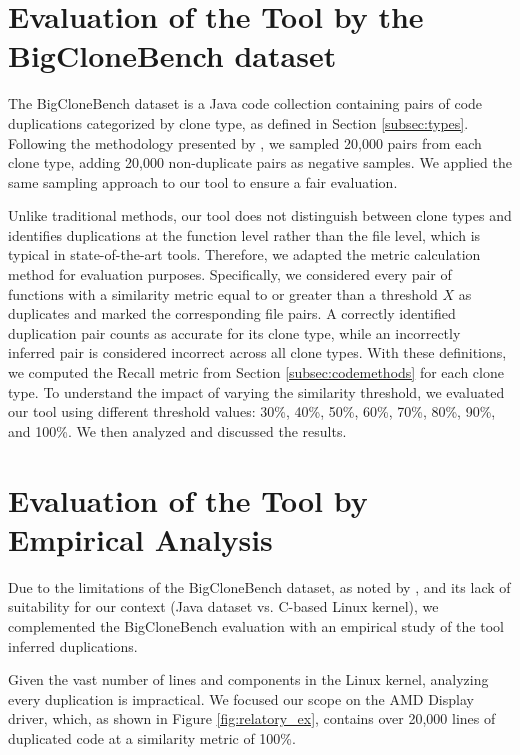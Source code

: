 \section{Evaluation of the Tool by the BigCloneBench dataset}

\label{sec:metbig}

The BigCloneBench dataset \citep{bigclonebench} is a Java code collection containing pairs of code duplications categorized by clone type, as defined in Section \ref{subsec:types}.
%
Following the methodology presented by \citep{tailor}, we sampled 20,000 pairs from each clone type, adding 20,000 non-duplicate pairs as negative samples. We applied the same sampling approach to our tool to ensure a fair evaluation.

Unlike traditional methods, our tool does not distinguish between clone types and identifies duplications at the function level rather than the file level, which is typical in state-of-the-art tools. Therefore, we adapted the metric calculation method for evaluation purposes. Specifically, we considered every pair of functions with a similarity metric equal to or greater than a threshold \(X\) as duplicates and marked the corresponding file pairs. A correctly identified duplication pair counts as accurate for its clone type, while an incorrectly inferred pair is considered incorrect across all clone types. With these definitions, we computed the Recall metric from Section \ref{subsec:codemethods} for each clone type.
%
To understand the impact of varying the similarity threshold, we evaluated our tool using different threshold values: 30\%, 40\%, 50\%, 60\%, 70\%, 80\%, 90\%, and 100\%. We then analyzed and discussed the results.

\section{Evaluation of the Tool by Empirical Analysis}

\label{sec:metemp}


Due to the limitations of the BigCloneBench dataset, as noted by \cite{bigfail}, and its lack of suitability 
for our context (Java dataset vs. C-based Linux kernel), we complemented the BigCloneBench evaluation with 
an empirical study of the tool inferred duplications.

%
Given the vast number of lines and components in the Linux kernel, analyzing every duplication is impractical. We focused our scope on the AMD Display driver, which, as shown in Figure \ref{fig:relatory_ex}, contains over 20,000 lines of duplicated code at a similarity metric of 100\%.

